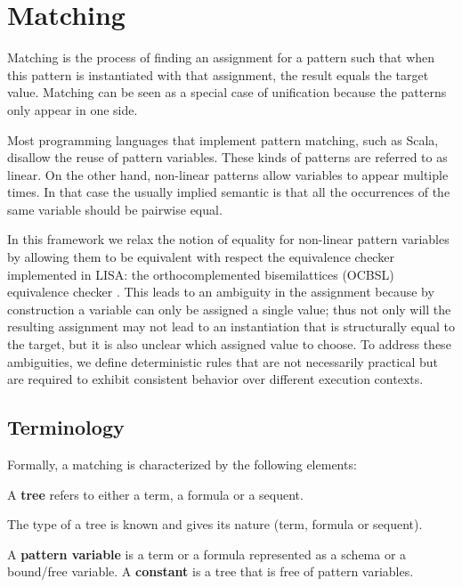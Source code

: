 \section{Matching}
\label{sec:matching}

Matching is the process of finding an assignment for a pattern such that when this pattern is instantiated with that assignment, the result equals the target value. Matching can be seen as a special case of unification because the patterns only appear in one side.

Most programming languages that implement pattern matching, such as Scala, disallow the reuse of pattern variables. These kinds of patterns are referred to as linear. On the other hand, non-linear patterns allow variables to appear multiple times. In that case the usually implied semantic is that all the occurrences of the same variable should be pairwise equal.

In this framework we relax the notion of equality for non-linear pattern variables by allowing them to be equivalent with respect the equivalence checker implemented in LISA: the orthocomplemented bisemilattices (OCBSL) equivalence checker \cite{Guilloud2022}. This leads to an ambiguity in the assignment because by construction a variable can only be assigned a single value; thus not only will the resulting assignment may not lead to an instantiation that is structurally equal to the target, but it is also unclear which assigned value to choose. To address these ambiguities, we define deterministic rules that are not necessarily practical but are required to exhibit consistent behavior over different execution contexts.

\subsection{Terminology}

Formally, a matching is characterized by the following elements:

\begin{definition}[Tree]
A \textbf{tree} refers to either a term, a formula or a sequent.
\end{definition}

The type of a tree is known and gives its nature (term, formula or sequent).

\begin{definition}
A \textbf{pattern variable} is a term or a formula represented as a schema or a bound/free variable.
A \textbf{constant} is a tree that is free of pattern variables.
\end{definition}

